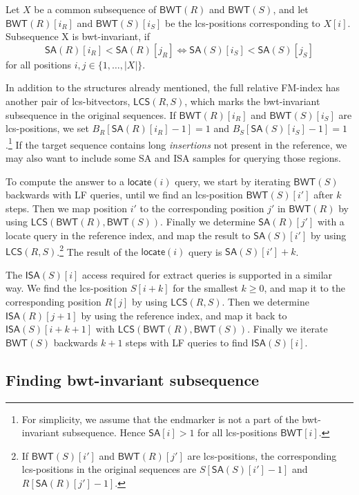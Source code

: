 \documentclass[a4paper,11pt]{llncs}
\newcommand{\set}[1]{\ensuremath{\{ #1 \}}}
\newcommand{\abs}[1]{\ensuremath{\lvert #1 \rvert}}
\newcommand{\SA}{\textsf{SA}}
\newcommand{\ISA}{\textsf{ISA}}
\newcommand{\mSA}{\ensuremath{\mathsf{SA}}}
\newcommand{\mISA}{\ensuremath{\mathsf{ISA}}}
\newcommand{\mBWT}{\ensuremath{\mathsf{BWT}}}
\newcommand{\mLCS}{\ensuremath{\mathsf{LCS}}}
\newcommand{\LF}{\textsf{LF}}
\newcommand{\locate}{\textsf{locate}}
\newcommand{\extract}{\textsf{extract}}
\newcommand{\mlocate}{\ensuremath{\mathsf{locate}}}
\begin{document}
\begin{definition}\label{def:bwt-invariant}
Let $X$ be a common subsequence of $\mBWT(R)$ and $\mBWT(S)$, and let $\mBWT(R)[i_{R}]$ and $\mBWT(S)[i_{S}]$ be the lcs-positions corresponding to $X[i]$. Subsequence X is bwt-invariant, if
$$
\mSA(R)[i_{R}] < \mSA(R)[j_{R}] \iff \mSA(S)[i_{S}] < \mSA(S)[j_{S}]
$$
for all positions $i, j \in \set{1, \dotsc, \abs{X}}$.
\end{definition}

In addition to the structures already mentioned, the full relative FM-index has another pair of lcs-bitvectors, $\mLCS(R,S)$, which marks the bwt-invariant subsequence in the original sequences. If $\mBWT(R)[i_{R}]$ and $\mBWT(S)[i_{S}]$ are lcs-positions, we set $B_{R}[\mSA(R)[i_{R}]-1] = 1$ and $B_{S}[\mSA(S)[i_{S}]-1] = 1$.\footnote{For simplicity, we assume that the endmarker is not a part of the bwt-invariant subsequence. Hence $\mSA[i] > 1$ for all lcs-positions $\mBWT[i]$.} If the target sequence contains long \emph{insertions} not present in the reference, we may also want to include some \SA{} and \ISA{} samples for querying those regions.

To compute the answer to a $\mlocate(i)$ query, we start by iterating $\mBWT(S)$ backwards with \LF{} queries, until we find an lcs-position $\mBWT(S)[i']$ after $k$ steps. Then we map position $i'$ to the corresponding position $j'$ in $\mBWT(R)$ by using $\mLCS(\mBWT(R),\mBWT(S))$. Finally we determine $\mSA(R)[j']$ with a \locate{} query in the reference index, and map the result to $\mSA(S)[i']$ by using $\mLCS(R,S)$.\footnote{If $\mBWT(S)[i']$ and $\mBWT(R)[j']$ are lcs-positions, the corresponding lcs-positions in the original sequences are $S[\mSA(S)[i']-1]$ and $R[\mSA(R)[j']-1]$.} The result of the $\mlocate(i)$ query is $\mSA(S)[i']+k$.

The $\mISA(S)[i]$ access required for \extract{} queries is supported in a similar way. We find the lcs-position $S[i+k]$ for the smallest $k \ge 0$, and map it to the corresponding position $R[j]$ by using $\mLCS(R,S)$. Then we determine $\mISA(R)[j+1]$ by using the reference index, and map it back to $\mISA(S)[i+k+1]$ with $\mLCS(\mBWT(R),\mBWT(S))$. Finally we iterate $\mBWT(S)$ backwards $k+1$ steps with \LF{} queries to find $\mISA(S)[i]$.

\subsection{Finding bwt-invariant subsequence}
\end{document}
